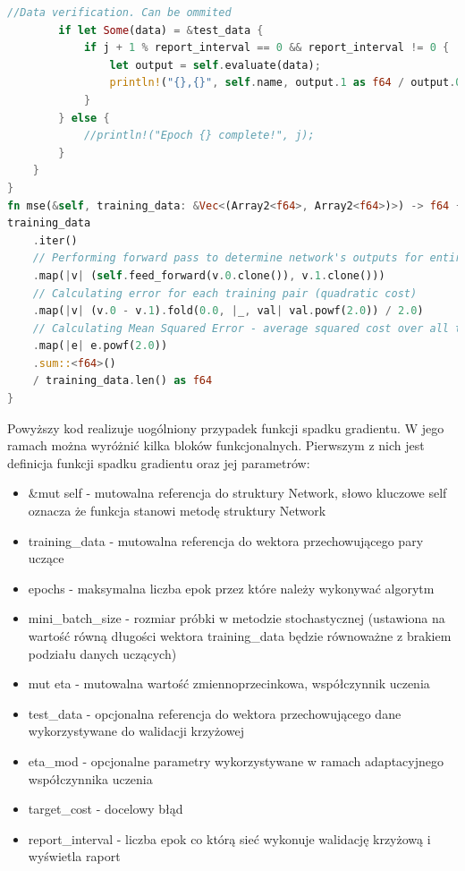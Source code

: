 \documentclass[12pt,twoside]{article}
\begin{document}
\begin{lstlisting}[language=Rust,caption=Realizacja funkcji stochastycznego spadku gradientu oraz funkcji błędu średniokwadratowego,label={lst:sgd}]
		//Data verification. Can be ommited
		if let Some(data) = &test_data {
			if j + 1 % report_interval == 0 && report_interval != 0 {
				let output = self.evaluate(data);
				println!("{},{}", self.name, output.1 as f64 / output.0 as f64);
			}
		} else {
			//println!("Epoch {} complete!", j);
		}
	}
}
fn mse(&self, training_data: &Vec<(Array2<f64>, Array2<f64>)>) -> f64 {
training_data
	.iter()
	// Performing forward pass to determine network's outputs for entire training set
	.map(|v| (self.feed_forward(v.0.clone()), v.1.clone()))
	// Calculating error for each training pair (quadratic cost)
	.map(|v| (v.0 - v.1).fold(0.0, |_, val| val.powf(2.0)) / 2.0)
	// Calculating Mean Squared Error - average squared cost over all training pairs
	.map(|e| e.powf(2.0))
	.sum::<f64>()
	/ training_data.len() as f64
}
\end{lstlisting}

Powyższy kod realizuje uogólniony przypadek funkcji spadku gradientu.
W jego ramach można wyróżnić kilka bloków funkcjonalnych.
Pierwszym z nich jest definicja funkcji spadku gradientu oraz jej parametrów:
\begin{itemize}
	\item &mut self - mutowalna referencja do struktury Network, słowo kluczowe self oznacza że funkcja stanowi metodę struktury Network
	\item training\_data - mutowalna referencja do wektora przechowującego pary uczące
	\item epochs - maksymalna liczba epok przez które należy wykonywać algorytm
	\item mini\_batch\_size - rozmiar próbki w metodzie stochastycznej (ustawiona na wartość równą długości wektora training\_data będzie równoważne z brakiem podziału danych uczących)
	\item mut eta - mutowalna wartość zmiennoprzecinkowa, współczynnik uczenia
	\item test\_data - opcjonalna referencja do wektora przechowującego dane wykorzystywane do walidacji krzyżowej
	\item eta\_mod - opcjonalne parametry wykorzystywane w ramach adaptacyjnego współczynnika uczenia
	\item target\_cost - docelowy błąd
	\item report\_interval - liczba epok co którą sieć wykonuje walidację krzyżową i wyświetla raport
\end{itemize}
\end{document}
